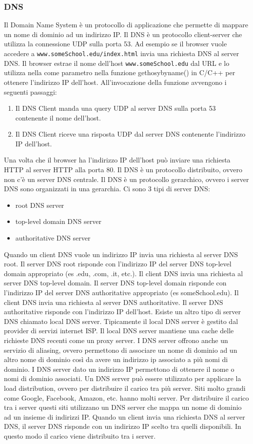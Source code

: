 \documentclass[12pt]{article}
\begin{document}
\subsubsection{DNS}
Il Domain Name System è un protocollo di applicazione che permette di mappare un nome di dominio ad un indirizzo IP.
Il DNS è un protocollo client-server che utilizza la connessione UDP sulla porta 53.
Ad esempio se il browser vuole accedere a \texttt{www.someSchool.edu/index.html} invia una richiesta DNS al server DNS.
Il browser estrae il nome dell'host \texttt{www.someSchool.edu} dal URL e lo utilizza  nella come parametro nella funzione gethosybyname() in C/C++ per ottenere l'indirizzo IP dell'host. All'invocazione della funzione avvengono i seguenti passaggi:
\begin{enumerate}
    \item Il DNS Client manda una query UDP al server DNS sulla porta 53 contenente il nome dell'host.
    \item Il DNS Client riceve una risposta UDP dal server DNS contenente l'indirizzo IP dell'host.
\end{enumerate}
Una volta che il browser ha l'indirizzo IP dell'host può inviare una richiesta HTTP al server HTTP alla porta 80.
Il DNS è un protocollo distribuito, ovvero non c'è un server DNS centrale.
Il DNS è un protocollo gerarchico, ovvero i server DNS sono organizzati in una gerarchia.
Ci sono 3 tipi di server DNS:
\begin{itemize}
    \item root DNS server
    \item top-level domain DNS server
    \item authoritative DNS server
\end{itemize}
Quando un client DNS vuole un indirizzo IP invia una richiesta al server DNS root.
Il server DNS root risponde con l'indirizzo IP del server DNS top-level domain appropriato (es .edu, .com, .it, etc.).
Il client DNS invia una richiesta al server DNS top-level domain.
Il server DNS top-level domain risponde con l'indirizzo IP del server DNS authoritative appropriato (es someSchool.edu).
Il client DNS invia una richiesta al server DNS authoritative.
Il server DNS authoritative risponde con l'indirizzo IP dell'host.
Esiste un altro tipo di server DNS chiamato local DNS server.
Tipicamente il local DNS server è gestito dal provider di servizi internet ISP.
Il local DNS server mantiene una cache delle richieste DNS recenti come un proxy server.
I DNS server offrono anche un servizio di aliasing, ovvero permettono di associare un nome di dominio ad un altro nome di dominio così da avere un indirizzo ip associato a più nomi di dominio.
I DNS server dato un indirizzo IP permettono di ottenere il nome o nomi di dominio associati.
Un DNS server può essere utilizzato per applicare la load distribution, ovvero per distribuire il carico tra più server.
Siti molto grandi come Google, Facebook, Amazon, etc. hanno molti server.
Per distribuire il carico tra i server questi siti utilizzano un DNS server che mappa un nome di dominio ad un insieme di indirizzi IP.
Quando un client invia una richiesta DNS al server DNS, il server DNS risponde con un indirizzo IP scelto tra quelli disponibili.
In questo modo il carico viene distribuito tra i server.
\end{document}

